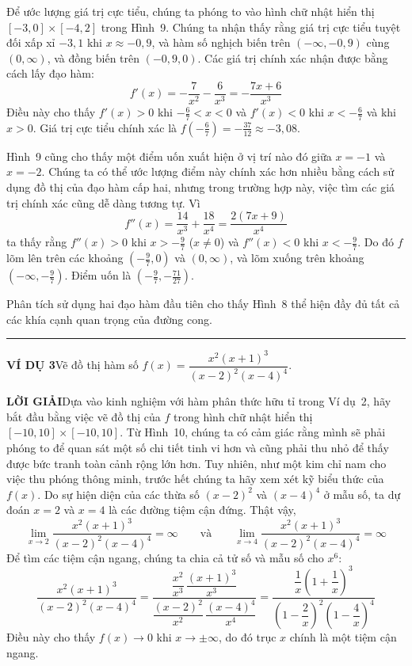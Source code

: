 \documentclass[10pt,a4paper]{article}
\begin{document}
\begin{minipage}[t]{0.71\textwidth}
    \vspace{0pt}
    Để ước lượng giá trị cực tiểu, chúng ta phóng to vào hình chữ nhật hiển thị $[-3, 0] \times [-4, 2]$ trong Hình~9. Chúng ta nhận thấy rằng giá trị cực tiểu tuyệt đối xấp xỉ $-3{,}1$ khi $x \approx -0{,}9$, và hàm số nghịch biến trên $(-\infty, -0{,}9)$ cùng $(0, \infty)$, và đồng biến trên $(-0{,}9, 0)$. Các giá trị chính xác nhận được bằng cách lấy đạo hàm:
    \[
        f'(x) = -\frac{7}{x^2} - \frac{6}{x^3} = -\frac{7x + 6}{x^3}
    \]
    Điều này cho thấy $f'(x) > 0$ khi $-\frac{6}{7} < x < 0$ và $f'(x) < 0$ khi $x < -\frac{6}{7}$ và khi $x > 0$. Giá trị cực tiểu chính xác là $f\left(-\frac{6}{7}\right) = -\frac{37}{12} \approx -3{,}08$.

    Hình~9 cũng cho thấy một điểm uốn xuất hiện ở vị trí nào đó giữa $x = -1$ và $x = -2$. Chúng ta có thể ước lượng điểm này chính xác hơn nhiều bằng cách sử dụng đồ thị của đạo hàm cấp hai, nhưng trong trường hợp này, việc tìm các giá trị chính xác cũng dễ dàng tương tự. Vì
    \[
        f''(x) = \frac{14}{x^3} + \frac{18}{x^4} = \frac{2(7x + 9)}{x^4}
    \]
    ta thấy rằng $f''(x) > 0$ khi $x > -\frac{9}{7}$ ($x \neq 0$) và $f''(x) < 0$ khi $x < -\frac{9}{7}$. Do đó $f$ lõm lên trên các khoảng $\left(-\frac{9}{7}, 0\right)$ và $(0, \infty)$, và lõm xuống trên khoảng $\left(-\infty, -\frac{9}{7}\right)$. Điểm uốn là $\left(-\frac{9}{7}, -\frac{71}{27}\right)$.

    Phân tích sử dụng hai đạo hàm đầu tiên cho thấy Hình~8 thể hiện đầy đủ tất cả các khía cạnh quan trọng của đường cong.\hfill\textcolor{stewartcyan}{\rule{1.1ex}{1.1ex}}

    \vspace{1.2em}
    \noindent\textcolor{stewartcyan}{\textbf{\textsf{VÍ DỤ 3}}}\quad Vẽ đồ thị hàm số $f(x) = \dfrac{x^2(x + 1)^3}{(x - 2)^2(x - 4)^4}$.

    \vspace{0.6em}
    \noindent\textcolor{stewartcyan}{\textbf{\textsf{LỜI GIẢI}}}\quad Dựa vào kinh nghiệm với hàm phân thức hữu tỉ trong Ví dụ~2, hãy bắt đầu bằng việc vẽ đồ thị của $f$ trong hình chữ nhật hiển thị $[-10, 10] \times [-10, 10]$. Từ Hình~10, chúng ta có cảm giác rằng mình sẽ phải phóng to để quan sát một số chi tiết tinh vi hơn và cũng phải thu nhỏ để thấy được bức tranh toàn cảnh rộng lớn hơn. Tuy nhiên, như một kim chỉ nam cho việc thu phóng thông minh, trước hết chúng ta hãy xem xét kỹ biểu thức của $f(x)$. Do sự hiện diện của các thừa số $(x - 2)^2$ và $(x - 4)^4$ ở mẫu số, ta dự đoán $x = 2$ và $x = 4$ là các đường tiệm cận đứng. Thật vậy,
    \[
        \lim_{x \to 2} \frac{x^2(x + 1)^3}{(x - 2)^2(x - 4)^4} = \infty \qquad \text{và} \qquad \lim_{x \to 4} \frac{x^2(x + 1)^3}{(x - 2)^2(x - 4)^4} = \infty
    \]
    Để tìm các tiệm cận ngang, chúng ta chia cả tử số và mẫu số cho $x^6$:
    \[
        \frac{x^2(x + 1)^3}{(x - 2)^2(x - 4)^4} = \frac{\dfrac{x^2}{x^3}\,\dfrac{(x + 1)^3}{x^3}}{\dfrac{(x - 2)^2}{x^2}\,\dfrac{(x - 4)^4}{x^4}} = \frac{\dfrac{1}{x}\left(1 + \dfrac{1}{x}\right)^3}{\left(1 - \dfrac{2}{x}\right)^2\left(1 - \dfrac{4}{x}\right)^4}
    \]
    Điều này cho thấy $f(x) \to 0$ khi $x \to \pm\infty$, do đó trục $x$ chính là một tiệm cận ngang.


\end{minipage}
\end{document}
